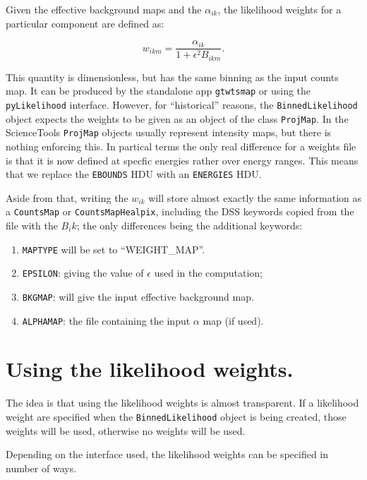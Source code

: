 \documentclass[preprint]{aastex}
\begin{document}
Given the effective background maps and the $\alpha_{ik}$, the
likelihood weights for a particular component are defined as:

\begin{equation}
w_{ikm} = \frac{\alpha_{ik}}{1 + \epsilon^2 B_{ikm}}.
\end{equation}

This quantity is dimensionless, but has the same binning as the input
counts map.  It can be produced by the standalone app {\tt gtwtsmap}
or using the {\tt pyLikelihood} interface.  However, for ``historical'' 
reasons, the {\tt BinnedLikelihood} object expects the weights to 
be given as an object of the class {\tt ProjMap}.  In the ScienceTools 
{\tt ProjMap} objects usually represent intensity maps, but there is 
nothing enforcing this.  In partical terms the only real difference 
for a weights file is that it is now defined at specfic energies
rather over energy ranges.  This means that we replace the {\tt EBOUNDS}
HDU with an {\tt ENERGIES} HDU.

Aside from that, writing the $w_{ik}$ will store almost exactly the
same information as a {\tt CountsMap} or {\tt CountsMapHealpix},
including the DSS keywords copied from the file with the $B_ik$; the
only differences being the additional keywords:

\begin{enumerate}
\item{{\tt MAPTYPE} will be set to ``WEIGHT\_MAP''.}
\item{{\tt EPSILON}: giving the value of $\epsilon$ used in the computation;}
\item{{\tt BKGMAP}: will give the input effective background map.}    
\item{{\tt ALPHAMAP}: the file containing the input $\alpha$ map (if used).}
\end{enumerate}


\section{Using the likelihood weights.}

The idea is that using the likelihood weights is almost transparent.  If a likelihood
weight are specified when the {\tt BinnedLikelihood} object is being created, those weights
will be used, otherwise no weights will be used.

Depending on the interface used, the likelihood weights can be specified in number of ways.
\end{document}
